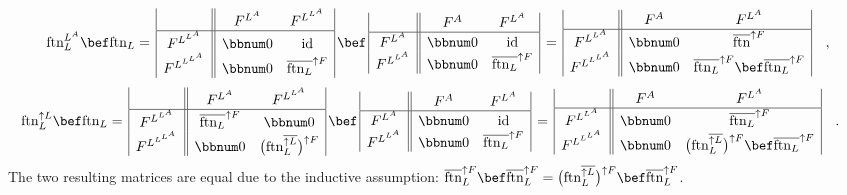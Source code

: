 \[
\text{ftn}_{L}^{L^{A}}\bef\text{ftn}_{L}=\,\begin{array}{|c||cc|}
 & F^{L^{A}} & F^{L^{L^{A}}}\\
\hline F^{L^{L^{A}}} & \bbnum 0 & \text{id}\\
F^{L^{L^{L^{A}}}} & \bbnum 0 & \overline{\text{ftn}_{L}}^{\uparrow F}
\end{array}\,\bef\,\begin{array}{|c||cc|}
 & F^{A} & F^{L^{A}}\\
\hline F^{L^{A}} & \bbnum 0 & \text{id}\\
F^{L^{L^{A}}} & \bbnum 0 & \overline{\text{ftn}_{L}}^{\uparrow F}
\end{array}\,=\,\begin{array}{|c||cc|}
 & F^{A} & F^{L^{A}}\\
\hline F^{L^{L^{A}}} & \bbnum 0 & \overline{\text{ftn}}^{\uparrow F}\\
F^{L^{L^{L^{A}}}} & \bbnum 0 & \overline{\text{ftn}_{L}}^{\uparrow F}\bef\overline{\text{ftn}_{L}}^{\uparrow F}
\end{array}\quad,
\]
\[
\negthickspace\negthickspace\negthickspace\negthickspace\text{ftn}_{L}^{\uparrow L}\bef\text{ftn}_{L}=\,\begin{array}{|c||cc|}
 & F^{L^{A}} & F^{L^{L^{A}}}\\
\hline F^{L^{L^{A}}} & \overline{\text{ftn}_{L}}^{\uparrow F} & \bbnum 0\\
F^{L^{L^{L^{A}}}} & \bbnum 0 & \big(\text{ftn}_{L}^{\overline{\uparrow L}}\big)^{\uparrow F}
\end{array}\,\bef\,\begin{array}{|c||cc|}
 & F^{A} & F^{L^{A}}\\
\hline F^{L^{A}} & \bbnum 0 & \text{id}\\
F^{L^{L^{A}}} & \bbnum 0 & \overline{\text{ftn}_{L}}^{\uparrow F}
\end{array}\,=\,\begin{array}{|c||cc|}
 & F^{A} & F^{L^{A}}\\
\hline F^{L^{L^{A}}} & \bbnum 0 & \overline{\text{ftn}_{L}}^{\uparrow F}\\
F^{L^{L^{L^{A}}}} & \bbnum 0 & \big(\text{ftn}_{L}^{\overline{\uparrow L}}\big)^{\uparrow F}\bef\overline{\text{ftn}_{L}}^{\uparrow F}
\end{array}\quad.
\]
The two resulting matrices are equal due to the inductive assumption:
$\overline{\text{ftn}}_{L}^{\uparrow F}\bef\overline{\text{ftn}}_{L}^{\uparrow F}=\big(\text{ftn}_{L}^{\overline{\uparrow L}}\big)^{\uparrow F}\bef\overline{\text{ftn}}_{L}^{\uparrow F}$.

